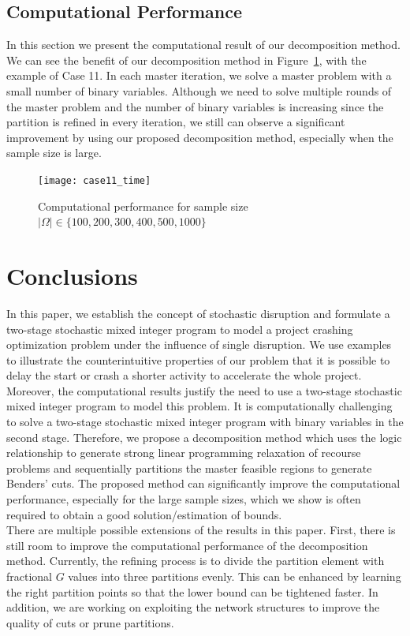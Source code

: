 \documentclass[11pt]{article}
\begin{document}
	\subsection{Computational Performance} \label{subsec:time}
	In this section we present the computational result of our decomposition method. 
	We can see the benefit of our decomposition method in Figure~\ref{fig:time}, with the example of Case 11. In each master iteration, we solve a master problem with a small number of binary variables. Although we need to solve multiple rounds of the master problem and the number of binary variables is increasing since the partition is refined in every iteration, we still can observe a significant improvement by using our proposed decomposition method, especially when the sample size is large.
	\begin{figure}[H]
		\centering
		\texttt{[image: case11\_time]}
		\caption{Computational performance for sample size \(|\Omega| \in \{100, 200, 300, 400, 500,1000\}\)}
		\label{fig:time}
	\end{figure}
\section{Conclusions} \label{sec:conclusions}
	In this paper, we establish the concept of stochastic disruption and formulate a two-stage stochastic mixed integer program to model a project crashing optimization problem under the influence of single disruption. We use examples to illustrate the counterintuitive properties of our problem that it is possible to delay the start or crash a shorter activity to accelerate the whole project. Moreover, the computational results justify the need to use a two-stage stochastic mixed integer program to model this problem. It is computationally challenging to solve a two-stage stochastic mixed integer program with binary variables in the second stage. Therefore, we propose a decomposition method which uses the logic relationship to generate strong linear programming relaxation of recourse problems and sequentially partitions the master feasible regions to generate Benders' cuts. The proposed method can significantly improve the computational performance, especially for the large sample sizes, which we show is often required to obtain a good solution/estimation of bounds.\\
	\newline
	There are multiple possible extensions of the results in this paper. First, there is still room to improve the computational performance of the decomposition method. Currently, the refining process is to divide the partition element with fractional \(G\) values into three partitions evenly. This can be enhanced by learning the right partition points so that the lower bound can be tightened faster. In addition, we are working on exploiting the network structures to improve the quality of cuts or prune partitions. 


\end{document}
